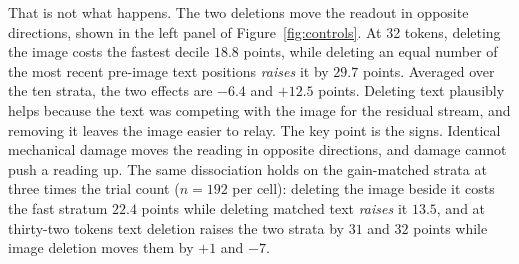 \documentclass{article}
\begin{document}
That is not what happens. The two deletions move the readout in opposite
directions, shown in the left panel of Figure~\ref{fig:controls}. At 32
tokens, deleting the image costs the fastest decile $18.8$ points, while
deleting an equal number of the most recent pre-image text positions
\emph{raises} it by $29.7$ points. Averaged over the ten strata, the two
effects are $-6.4$ and $+12.5$ points. Deleting text plausibly helps because
the text was competing with the image for the residual stream, and removing
it leaves the image easier to relay. The key point is the signs. Identical
mechanical damage moves the reading in opposite directions, and damage cannot
push a reading up.
The same dissociation holds on the gain-matched strata at three times the
trial count ($n = 192$ per cell): deleting the image beside it costs the fast
stratum $22.4$ points while deleting matched text \emph{raises} it $13.5$,
and at thirty-two tokens text deletion raises the two strata by $31$ and $32$
points while image deletion moves them by $+1$ and $-7$.
\end{document}
